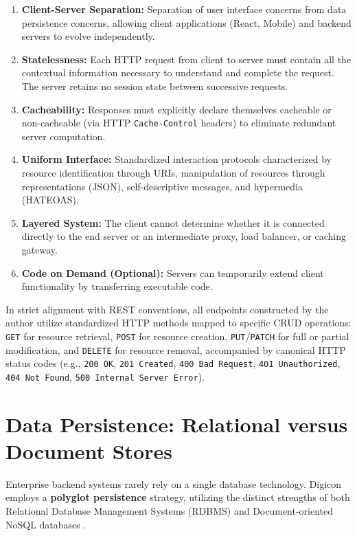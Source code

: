 \begin{enumerate}
    \item \textbf{Client-Server Separation:} Separation of user interface concerns from data persistence concerns, allowing client applications (React, Mobile) and backend servers to evolve independently.
    \item \textbf{Statelessness:} Each HTTP request from client to server must contain all the contextual information necessary to understand and complete the request. The server retains no session state between successive requests.
    \item \textbf{Cacheability:} Responses must explicitly declare themselves cacheable or non-cacheable (via HTTP \texttt{Cache-Control} headers) to eliminate redundant server computation.
    \item \textbf{Uniform Interface:} Standardized interaction protocols characterized by resource identification through URIs, manipulation of resources through representations (JSON), self-descriptive messages, and hypermedia (HATEOAS).
    \item \textbf{Layered System:} The client cannot determine whether it is connected directly to the end server or an intermediate proxy, load balancer, or caching gateway.
    \item \textbf{Code on Demand (Optional):} Servers can temporarily extend client functionality by transferring executable code.
\end{enumerate}

In strict alignment with REST conventions, all endpoints constructed by the author utilize standardized HTTP methods mapped to specific CRUD operations: \texttt{GET} for resource retrieval, \texttt{POST} for resource creation, \texttt{PUT}/\texttt{PATCH} for full or partial modification, and \texttt{DELETE} for resource removal, accompanied by canonical HTTP status codes (e.g., \texttt{200 OK}, \texttt{201 Created}, \texttt{400 Bad Request}, \texttt{401 Unauthorized}, \texttt{404 Not Found}, \texttt{500 Internal Server Error}).

\section{Data Persistence: Relational versus Document Stores}
\label{sec:tech_persistence}

Enterprise backend systems rarely rely on a single database technology. Digicon employs a \textbf{polyglot persistence} strategy, utilizing the distinct strengths of both Relational Database Management Systems (RDBMS) and Document-oriented NoSQL databases \citep{stonebraker2010sql}.

